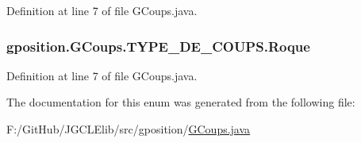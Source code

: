 Definition at line 7 of file G\-Coups.\-java.

\hypertarget{enumgposition_1_1_g_coups_1_1_t_y_p_e___d_e___c_o_u_p_s_a41fe1ec334b1b0dad438c2d81e43a9f7}{
\subsubsection[{Roque}]{\setlength{\rightskip}{0pt plus 5cm}gposition.\-G\-Coups.\-T\-Y\-P\-E\-\_\-\-D\-E\-\_\-\-C\-O\-U\-P\-S.\-Roque}}\label{enumgposition_1_1_g_coups_1_1_t_y_p_e___d_e___c_o_u_p_s_a41fe1ec334b1b0dad438c2d81e43a9f7}


Definition at line 7 of file G\-Coups.\-java.



The documentation for this enum was generated from the following file\-:\begin{DoxyCompactItemize}
\item 
F\-:/\-Git\-Hub/\-J\-G\-C\-L\-Elib/src/gposition/\hyperlink{_g_coups_8java}{G\-Coups.\-java}\end{DoxyCompactItemize}
